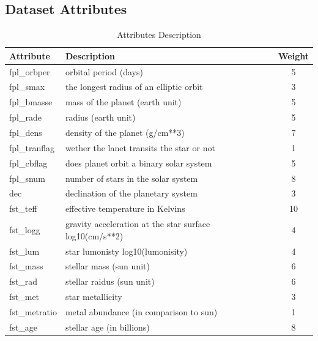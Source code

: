 \documentclass[12p]{article}
\begin{document}
\begin{landscape}
    \section{Dataset Attributes}
    \begin{table}[!h]\centering
        \caption{Attributes Description}
        \label{tab:att_desc}
        \begin{tabular}{|l l c|}\hline
            Attribute         & Description & Weight \\ \hline\hline
            fpl\_orbper      & orbital period (days) & 5 \\ \hline
            fpl\_smax        & the longest radius of an elliptic orbit & 3 \\ \hline
            fpl\_bmasse    & mass of the planet (earth unit) & 5 \\ \hline
            fpl\_rade         & radius (earth unit) & 5 \\ \hline
            fpl\_dens        & density of the planet (g/cm**3) & 7 \\ \hline
            fpl\_tranflag    & wether the lanet transits the star or not & 1 \\ \hline
            fpl\_cbflag      & does planet orbit a binary solar system & 5 \\ \hline
            fpl\_snum       & number of stars in the solar system & 8 \\ \hline
            dec                 & declination of the planetary system & 3 \\ \hline
            fst\_teff          & effective temperature in Kelvins & 10 \\ \hline
            fst\_logg        & gravity acceleration at the star surface log10(cm/s**2) & 4 \\ \hline
            fst\_lum         & star lumonisty log10(lumonisity) & 4 \\ \hline
            fst\_mass       & stellar mass (sun unit) & 6 \\ \hline
            fst\_rad         & stellar raidus (sun unit) & 6 \\ \hline
            fst\_met        & star metallicity & 3 \\ \hline
            fst\_metratio & metal abundance (in comparison to sun) & 1 \\ \hline
            fst\_age         & stellar age (in billions) & 8 \\ \hline
        \end{tabular}
    \end{table}
\end{landscape}
\end{document}

